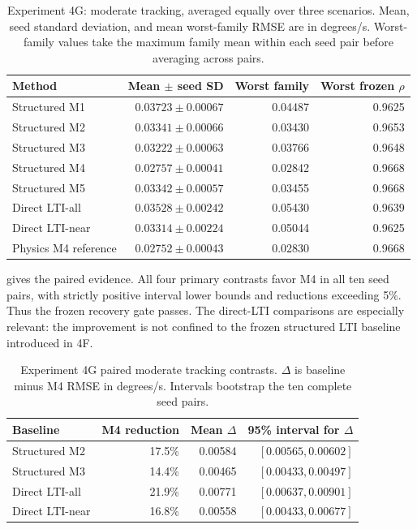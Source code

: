 \begin{table}[htbp]
\centering
\caption{Experiment 4G: moderate tracking, averaged equally over three scenarios.
Mean, seed standard deviation, and mean worst-family RMSE are in degrees/s.
Worst-family values take the maximum family mean within each seed pair before
averaging across pairs.}
\label{tab:experiment4g-means}
\begin{tabular}{lrrr}
\toprule
Method & Mean $\pm$ seed SD & Worst family & Worst frozen $\rho$\\
\midrule
Structured M1 & $0.03723\pm0.00067$ & 0.04487 & 0.9625\\
Structured M2 & $0.03341\pm0.00066$ & 0.03430 & 0.9653\\
Structured M3 & $0.03222\pm0.00063$ & 0.03766 & 0.9648\\
Structured M4 & $\mathbf{0.02757}\pm0.00041$ & 0.02842 & 0.9668\\
Structured M5 & $0.03342\pm0.00057$ & 0.03455 & 0.9668\\
Direct LTI-all & $0.03528\pm0.00242$ & 0.05430 & 0.9639\\
Direct LTI-near & $0.03314\pm0.00224$ & 0.05044 & 0.9625\\
Physics M4 reference & $0.02752\pm0.00043$ & 0.02830 & 0.9668\\
\bottomrule
\end{tabular}
\end{table}

 gives the paired evidence. All four primary
contrasts favor M4 in all ten seed pairs, with strictly positive interval lower
bounds and reductions exceeding 5\%. Thus the frozen recovery gate passes.
The direct-LTI comparisons are especially relevant: the improvement is not
confined to the frozen structured LTI baseline introduced in 4F.

\begin{table}[htbp]
\centering
\caption{Experiment 4G paired moderate tracking contrasts. $\Delta$ is baseline
minus M4 RMSE in degrees/s. Intervals bootstrap the ten complete seed pairs.}
\label{tab:experiment4g-paired}
\begin{tabular}{lrrr}
\toprule
Baseline & M4 reduction & Mean $\Delta$ & 95\% interval for $\Delta$\\
\midrule
Structured M2 & 17.5\% & 0.00584 & $[0.00565,0.00602]$\\
Structured M3 & 14.4\% & 0.00465 & $[0.00433,0.00497]$\\
Direct LTI-all & 21.9\% & 0.00771 & $[0.00637,0.00901]$\\
Direct LTI-near & 16.8\% & 0.00558 & $[0.00433,0.00677]$\\
\bottomrule
\end{tabular}
\end{table}

